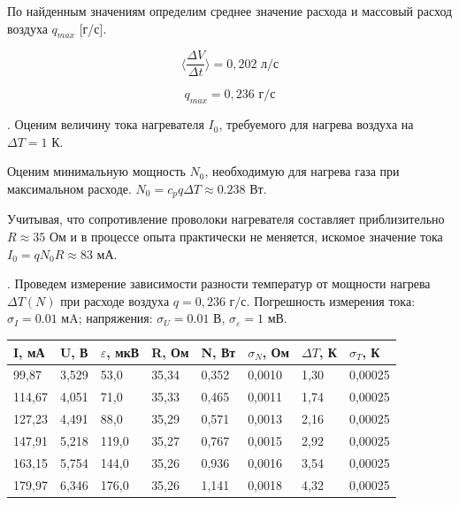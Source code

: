\documentclass[a4paper,12pt]{article} %
\begin{document}
\noindent По найденным значениям определим среднее значение расхода и массовый расход воздуха $q_{max}$ [г/с].

$$\langle\frac{\Delta V}{\Delta t}\rangle = 0,202\text{ л/с}$$

$$q_{max} = 0,236\text{ г/с}$$

. Оценим величину тока нагревателя $I_{0}$, требуемого для нагрева воздуха на $\Delta T = 1\text{ К}$.

\medskip
 	
\noindent Оценим минимальную мощность $N_0$, необходимую для нагрева газа при максимальном расходе. $N_{0} = c_{p}q\Delta T \approx 0.238 \text{ Вт}.$
	
\medskip	
	
\noindent Учитывая, что сопротивление проволоки нагревателя составляет приблизительно $R \approx 35\text{ Ом}$ и в процессе опыта практически не меняется, искомое значение тока $I_{0} = q N_{0} R \approx 83 \text{ мА}.$
	
\medskip	
	
. Проведем измерение зависимости разности температур от мощности нагрева $\Delta T(N)$ при расходе воздуха $q = 0,236 \text{ г/с}.$ Погрешность измерения тока: $\sigma_{I} = 0.01 \text{ мA}$;  напряжения: $\sigma_{U}= 0.01 \text{ В}$, $\sigma_{\varepsilon}= 1 \text{ мВ}$.

\begin{table}[h!]
\begin{tabular}{|l|l|l|l|l|l|l|l|}
\hline
I, мА  & U, В  & $\varepsilon$, мкВ & R, Ом & N, Вт & $\sigma_N$,    Ом & $\Delta T$, К & $\sigma_T$, К \\ \hline
99,87  & 3,529 & 53,0            & 35,34 & 0,352 & 0,0010            & 1,30          & 0,00025       \\ \hline
114,67 & 4,051 & 71,0            & 35,33 & 0,465 & 0,0011            & 1,74          & 0,00025       \\ \hline
127,23 & 4,491 & 88,0            & 35,29 & 0,571 & 0,0013            & 2,16          & 0,00025       \\ \hline
147,91 & 5,218 & 119,0           & 35,27 & 0,767 & 0,0015            & 2,92          & 0,00025       \\ \hline
163,15 & 5,754 & 144,0           & 35,26 & 0,936 & 0,0016            & 3,54          & 0,00025       \\ \hline
179,97 & 6,346 & 176,0           & 35,26 & 1,141 & 0,0018            & 4,32          & 0,00025       \\ \hline
\end{tabular}
\end{table}
	
\end{document}
